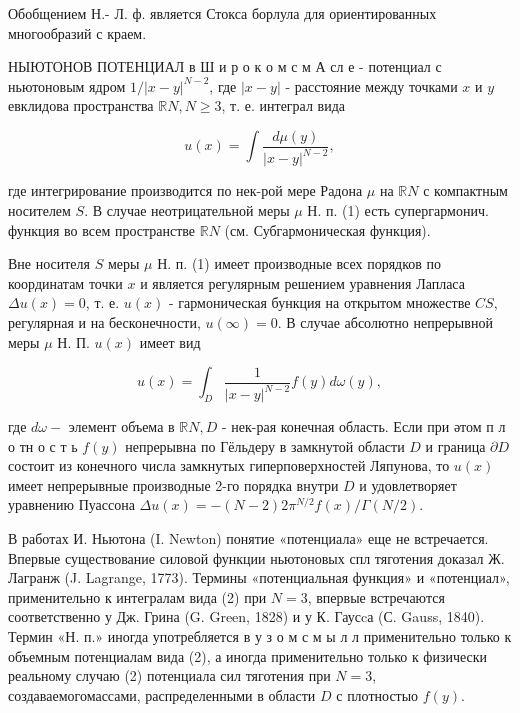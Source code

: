 \documentclass[10pt]{article}
\begin{document}
Обобщением Н.- Л. ф. является Стокса борлула для ориентированных многообразий с краем.



НЫЮТОНОВ ПОТЕНЦИАЛ в Ш и р о к о м с м А сл е - потенциал с ньютоновым ядром $1 /|x-y|^{N-2}$, где $|x-y|$ - расстояние между точками $x$ и $y$ евклидова пространства $\mathbb{R} N, N \geqslant 3$, т. е. интеграл вида



\[

u(x)=\int \frac{d \mu(y)}{|x-y|^{N-2}},

\]



где интегрирование производится по нек-рой мере Радона $\mu$ на $\mathbb{R} N$ с компактным носителем $S$. В случае неотрицательной меры $\mu$ Н. п. (1) есть супергармонич. функция во всем пространстве $\mathbb{R} N$ (см. Субгармоническая функция).



Вне носителя $S$ меры $\mu$ Н. п. (1) имеет производные всех порядков по координатам точки $x$ и является регулярным решением уравнения Лапласа $\Delta u(x)=0$, т. е. $u(x)$ - гармоническая бункция на открытом множестве $C S$, регулярная и на бесконечности, $u(\infty)=0$. В случае абсолютно непрерывной меры $\mu$ Н. П. $u(x)$ имеет вид



\[

u(x)=\int_{D} \frac{1}{|x-y|^{N-2}} f(y) d \omega(y),

\]



где $d \omega-$ элемент объема в $\mathbb{R} N, D$ - нек-рая конечная область. Если при әтом п л о тн о с т ь $f(y)$ непрерывна по Гёльдеру в замкнутой области $D$ и граница $\partial D$ состоит из конечного числа замкнутых гиперповерхностей Ляпунова, то $u(x)$ имеет непрерывные производные 2-го порядка внутри $D$ и удовлетворяет уравнению Пуассона $\Delta u(x)=-(N-2) 2 \pi^{N / 2} f(x) / \Gamma(N / 2)$.



В работах И. Ньютона (I. Newton) понятие «потенциала» еще не встречается. Впервые существование силовой функции ньютоновых спл тяготения доказал Ж. Лагранж (J. Lagrange, 1773). Термины «потенциальная функция» и «потенциал», применительно к интегралам вида (2) при $N=3$, впервые встречаются соответственно у Дж. Грина (G. Green, 1828) и у К. Гаусcа (С. Gauss, 1840). Термин «Н. п.» иногда употребляется в у з о м с м ы л л применительно только к объемным потенциалам вида (2), а иногда применительно только к физически реальному случаю (2) потенциала сил тяготения при $N=3$, создаваемогомассами, распределенными в области $D$ с плотностыо $f(y)$.
\end{document}
